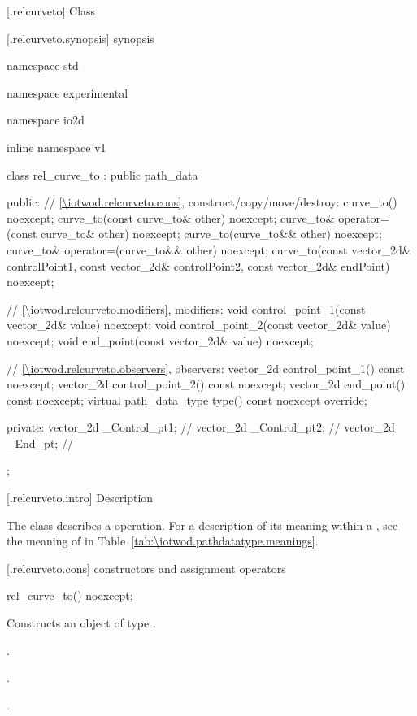 [\iotwod.relcurveto] {Class }

 [\iotwod.relcurveto.synopsis] { synopsis}

\begin{codeblock}
namespace std { namespace experimental { namespace io2d { inline namespace v1 {
  class rel_curve_to : public path_data {
  public:
    // \ref{\iotwod.relcurveto.cons}, construct/copy/move/destroy:
    curve_to() noexcept;
    curve_to(const curve_to& other) noexcept;
    curve_to& operator=(const curve_to& other) noexcept;
    curve_to(curve_to&& other) noexcept;
    curve_to& operator=(curve_to&& other) noexcept;
    curve_to(const vector_2d& controlPoint1, const vector_2d& controlPoint2,
      const vector_2d& endPoint) noexcept;

    // \ref{\iotwod.relcurveto.modifiers}, modifiers:
    void control_point_1(const vector_2d& value) noexcept;
    void control_point_2(const vector_2d& value) noexcept;
    void end_point(const vector_2d& value) noexcept;


    // \ref{\iotwod.relcurveto.observers}, observers:
    vector_2d control_point_1() const noexcept;
    vector_2d control_point_2() const noexcept;
    vector_2d end_point() const noexcept;
    virtual path_data_type type() const noexcept override;
    
  private:
    vector_2d _Control_pt1; // \expos
    vector_2d _Control_pt2; // \expos
    vector_2d _End_pt;      // \expos
  };
} } } }
\end{codeblock}

 [\iotwod.relcurveto.intro] { Description}

\pnum
{}
The class  describes a  operation. For a description of its meaning within a , see the meaning of  in Table~\ref{tab:\iotwod.pathdatatype.meanings}.

 [\iotwod.relcurveto.cons] { constructors and assignment operators}

\begin{itemdecl}
    rel_curve_to() noexcept;
\end{itemdecl}
\begin{itemdescr}
	\pnum
	\effects
	Constructs an object of type .
	
	\pnum
	\postconditions
	.

	.

	.

\end{itemdescr}

